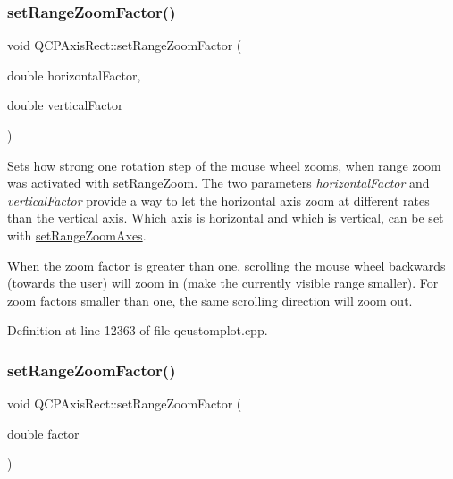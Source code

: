 \subsubsection{\texorpdfstring{set\+Range\+Zoom\+Factor()}{setRangeZoomFactor()}\hspace{0.1cm}{\footnotesize\ttfamily [1/2]}}
{\footnotesize\ttfamily void Q\+C\+P\+Axis\+Rect\+::set\+Range\+Zoom\+Factor (\begin{DoxyParamCaption}\item[{double}]{horizontal\+Factor,  }\item[{double}]{vertical\+Factor }\end{DoxyParamCaption})}

Sets how strong one rotation step of the mouse wheel zooms, when range zoom was activated with \hyperlink{class_q_c_p_axis_rect_a7960a9d222f1c31d558b064b60f86a31}{set\+Range\+Zoom}. The two parameters {\itshape horizontal\+Factor} and {\itshape vertical\+Factor} provide a way to let the horizontal axis zoom at different rates than the vertical axis. Which axis is horizontal and which is vertical, can be set with \hyperlink{class_q_c_p_axis_rect_a9442cca2aa358405f39a64d51eca13d2}{set\+Range\+Zoom\+Axes}.

When the zoom factor is greater than one, scrolling the mouse wheel backwards (towards the user) will zoom in (make the currently visible range smaller). For zoom factors smaller than one, the same scrolling direction will zoom out. 

Definition at line 12363 of file qcustomplot.\+cpp.

\mbox{\label{class_q_c_p_axis_rect_ae83d187b03fc6fa4f00765ad50cd3fc3}} 
\subsubsection{\texorpdfstring{set\+Range\+Zoom\+Factor()}{setRangeZoomFactor()}\hspace{0.1cm}{\footnotesize\ttfamily [2/2]}}
{\footnotesize\ttfamily void Q\+C\+P\+Axis\+Rect\+::set\+Range\+Zoom\+Factor (\begin{DoxyParamCaption}\item[{double}]{factor }\end{DoxyParamCaption})}

